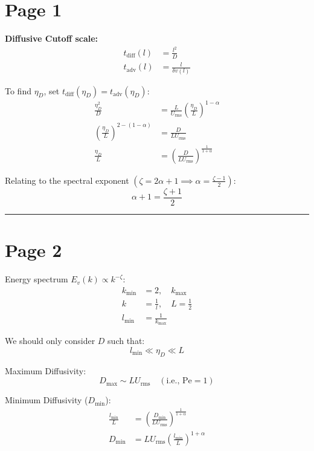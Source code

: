\documentclass{article}
\begin{document}
\section*{Page 1}

\textbf{Diffusive Cutoff scale:}
\begin{align*}
t_{\text{diff}}(l) &= \frac{l^{2}}{D} \\
t_{\text{adv}}(l) &= \frac{l}{\delta v(l)}
\end{align*}

To find $\eta_D$, set $t_{\text{diff}}(\eta_D) = t_{\text{adv}}(\eta_D)$:
\begin{align*}
\frac{\eta_{D}^{2}}{D} &= \frac{L}{U_{\text{rms}}}\left(\frac{\eta_{D}}{L}\right)^{1-\alpha} \\
\left(\frac{\eta_{D}}{L}\right)^{2-(1-\alpha)} &= \frac{D}{L U_{\text{rms}}} \\
\frac{\eta_{D}}{L} &= \left(\frac{D}{L U_{\text{rms}}}\right)^{\frac{1}{1+\alpha}}
\end{align*}

Relating to the spectral exponent $\left(\zeta = 2\alpha + 1 \implies \alpha = \frac{\zeta - 1}{2}\right)$:
\[ \alpha + 1 = \frac{\zeta + 1}{2} \]

\vspace{1em}
\hrule
\vspace{1em}

\section*{Page 2}

Energy spectrum $E_{v}(k) \propto k^{-\zeta}$:
\begin{align*}
k_{\text{min}} &= 2, \quad k_{\text{max}} \\
k &= \frac{1}{l}, \quad L = \frac{1}{2} \\
l_{\text{min}} &= \frac{1}{k_{\text{max}}}
\end{align*}

We should only consider $D$ such that:
\[ l_{\text{min}} \ll \eta_{D} \ll L \]

Maximum Diffusivity:
\[ D_{\text{max}} \sim L U_{\text{rms}} \quad (\text{i.e., } \text{Pe}=1) \]

Minimum Diffusivity ($D_{\text{min}}$):
\begin{align*}
\frac{l_{\text{min}}}{L} &= \left(\frac{D_{\text{min}}}{L U_{\text{rms}}}\right)^{\frac{1}{1+\alpha}} \\
D_{\text{min}} &= L U_{\text{rms}}\left(\frac{l_{\text{min}}}{L}\right)^{1+\alpha}
\end{align*}
\end{document}
